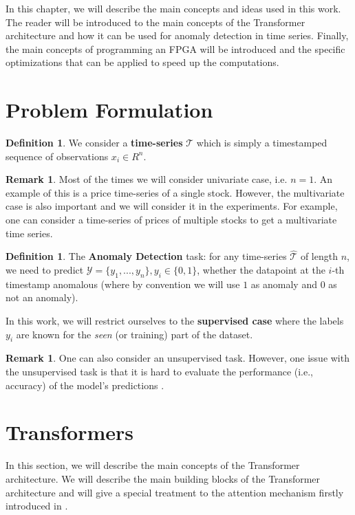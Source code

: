 \documentclass[a4paper, twoside]{report}
\theoremstyle{definition}
\newtheorem{definition}[theorem]{Definition}
\newtheorem{remark}[theorem]{Remark}
\numberwithin{equation}{section}
\begin{document}
In this chapter, we will describe the main concepts and ideas used in this work.
The reader will be introduced to the main concepts of the Transformer architecture and how it can be used for anomaly detection in time series.
Finally, the main concepts of programming an FPGA will be introduced and the specific optimizations that can be applied to speed up the computations.


\section{Problem Formulation}


\begin{definition}
    We consider a \textbf{time-series} $\mathcal{T}$ which is simply a timestamped sequence of observations $x_i \in R^n$.
\end{definition}
\begin{remark}
    Most of the times we will consider univariate case, i.e. $n=1$.
    An example of this is a price time-series of a single stock.
    However, the multivariate case is also important and we will consider it in the experiments.
    For example, one can consider a time-series of prices of multiple stocks to get a multivariate time series.
\end{remark}


\begin{definition}
    The \textbf{Anomaly Detection} task:
    for any time-series $\hat{\mathcal{T}}$ of length $n$, we need to predict $\mathcal{Y} = \{y_1, . . . , y_n \}, y_i \in \{0, 1\}$,
    whether the datapoint at the $i$-th timestamp anomalous (where by convention we will use $1$ as anomaly and $0$ as not an anomaly).
\end{definition}
In this work, we will restrict ourselves to the \textbf{supervised case}
where the labels $y_i$ are known for the \emph{seen} (or training) part of the dataset.

\begin{remark}
    One can also consider an unsupervised task.
    However, one issue with the unsupervised task is that it is hard to evaluate
    the performance (i.e., accuracy) of the model's predictions \cite{1905.05667}.
\end{remark}


\section{Transformers}

In this section, we will describe the main concepts of the Transformer architecture.
We will describe the main building blocks of the Transformer architecture
and will give a special treatment to the attention mechanism firstly introduced in \cite{1409.0473}.
\end{document}
